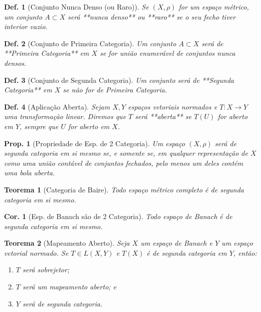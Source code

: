 \documentclass[11pt]{article}
\theoremstyle{yellowhead}
\newtheorem*{theorem}{Teorema}
\newtheorem*{proposition}{Prop.}
\newtheorem*{corollary}{Cor.}
\theoremstyle{yellowdef}
\newtheorem*{definition}{Def.}
\begin{document}
\begin{multicols}{3}
\begin{definition}[Conjunto Nunca Denso (ou Raro)]
Se $(X , \rho)$ for um espaço métrico, um conjunto $A \subset X$ será **nunca denso** ou **raro** se o seu fecho tiver interior vazio.
\end{definition}

\begin{definition}[Conjunto de Primeira Categoria]
Um conjunto $A \subset X$ será de **Primeira Categoria** em $X$ se for união enumerável de conjuntos nunca densos.
\end{definition}

\begin{definition}[Conjunto de Segunda Categoria]
Um conjunto será de **Segunda Categoria** em $X$ se não for de Primeira Categoria.
\end{definition}

\begin{definition}[Aplicação Aberta]
Sejam $X ,Y$ espaços vetoriais normados e $T : X \rightarrow Y$ uma transformação linear. Diremos que $T$ será **aberta** se $T(U)$ for aberto em $Y$, sempre que $U$ for aberto em $X$.
\end{definition}
\begin{proposition}[Propriedade de Esp. de 2 Categoria]
Um espaço $(X, \rho)$ será de segunda categoria em si mesmo se, e somente se, em qualquer representação de $X$ como uma união contável de conjuntos fechados, pelo menos um deles contém uma bola aberta.
\end{proposition}

\begin{theorem}[Categoria de Baire]
Todo espaço métrico completo é de segunda categoria em si mesmo.
\end{theorem}

\begin{corollary}[Esp. de Banach são de 2 Categoria]
Todo espaço de Banach é de segunda categoria em si mesmo.
\end{corollary}

\begin{theorem}[Mapeamento Aberto]
Seja $X$ um espaço de Banach e $Y$ um espaço vetorial normado. Se $T \in L(X, Y)$ e $T(X)$ é de segunda categoria em $Y$, então:
\begin{enumerate}[label=(\alph*)]
    \item $T$ será sobrejetor;
    \item $T$ será um mapeamento aberto; e
    \item $Y$ será de segunda categoria.
\end{enumerate}
\end{theorem}


\end{multicols}
\end{document}

